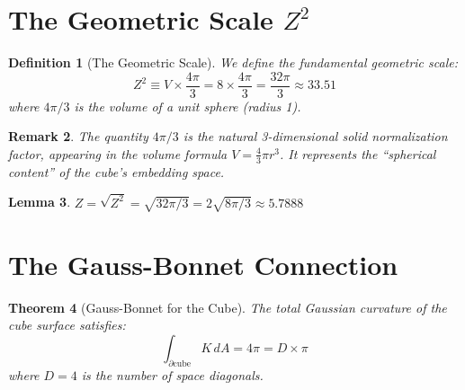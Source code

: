 \documentclass[twocolumn,showpacs,preprintnumbers,amsmath,amssymb,prd]{revtex4-2}
\newtheorem{theorem}{Theorem}[section]
\newtheorem{lemma}[theorem]{Lemma}
\newtheorem{definition}[theorem]{Definition}
\newtheorem{remark}[theorem]{Remark}
\begin{document}
\section{The Geometric Scale $Z^2$}

\begin{definition}[The Geometric Scale]
We define the fundamental geometric scale:
\begin{equation}
Z^2 \equiv V \times \frac{4\pi}{3} = 8 \times \frac{4\pi}{3} = \frac{32\pi}{3} \approx 33.51
\end{equation}
where $4\pi/3$ is the volume of a unit sphere (radius 1).
\end{definition}

\begin{remark}
The quantity $4\pi/3$ is the natural 3-dimensional solid normalization factor, appearing in the volume formula $V = \frac{4}{3}\pi r^3$. It represents the ``spherical content'' of the cube's embedding space.
\end{remark}

\begin{lemma}
\label{lem:Z}
$Z = \sqrt{Z^2} = \sqrt{32\pi/3} = 2\sqrt{8\pi/3} \approx 5.7888$
\end{lemma}

\section{The Gauss-Bonnet Connection}

\begin{theorem}[Gauss-Bonnet for the Cube]
\label{thm:gaussbonnet}
The total Gaussian curvature of the cube surface satisfies:
\begin{equation}
\int_{\partial \text{cube}} K \, dA = 4\pi = D \times \pi
\end{equation}
where $D = 4$ is the number of space diagonals.
\end{theorem}
\end{document}
